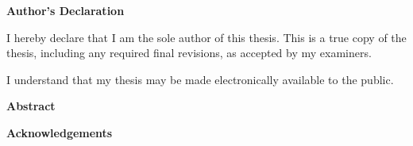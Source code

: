 \cleardoublepage %


 \begin{center}\textbf{Author's Declaration}\end{center}
  
\noindent
I hereby declare that I am the sole author of this thesis. This is a true copy of the thesis, including any required final revisions, as accepted by my examiners.

I understand that my thesis may be made electronically available to the public.

\cleardoublepage

%
%
%
%


\begin{center}\textbf{Abstract}\end{center}




\cleardoublepage


\begin{center}\textbf{Acknowledgements}\end{center}

